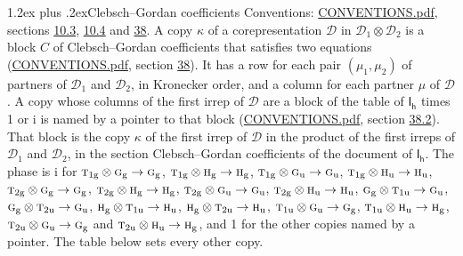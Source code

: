 \documentclass[10pt,a4paper]{article}
\makeatletter
\renewcommand\section{\@startsection{section}{1}{\z@}{-3ex plus -1ex minus -.2ex}%
  {1.2ex plus .2ex}{\normalfont\large\sffamily\bfseries\color{parttitle}}}
\numberwithin{equation}{section}
\newcommand{\grp}[1]{\mathsf{#1}}
\newcommand{\irr}[1]{\text{\normalfont\scshape #1}}
\newcommand{\ptag}[1]{\mathrm{#1}}
\newcommand{\iunit}{\mathrm{i}}
\newcommand{\irrprod}{\otimes}
\newcommand{\mult}{\kappa}
\newcommand{\intx}{\mu}
\makeatother
\begin{document}
\section{Clebsch--Gordan coefficients}\label{s:clebsch_gordan}
Conventions: \href{../../CONVENTIONS.pdf}{CONVENTIONS.pdf}, sections \href{../../../rotation/CONVENTIONS.pdf\#conv.10.3}{10.3}, \href{../../../rotation/CONVENTIONS.pdf\#conv.10.4}{10.4} and \href{../../CONVENTIONS.pdf\#conv.38}{38}.
\leavevmode\label{n:index.copy}\label{n:matrix.cg.stored}A copy $\mult$ of a corepresentation $\mathcal{D}$ in $\mathcal{D}_1\irrprod\mathcal{D}_2$ is a block $C$ of Clebsch--Gordan coefficients that satisfies two equations (\href{../../CONVENTIONS.pdf}{CONVENTIONS.pdf}, section \href{../../CONVENTIONS.pdf\#conv.38}{38}). \label{n:index.cg}It has a row for each pair $(\intx_1, \intx_2)$ of partners of $\mathcal{D}_1$ and $\mathcal{D}_2$, in Kronecker order, and a column for each partner $\intx$ of $\mathcal{D}$.
A copy whose columns of the first irrep of $\mathcal{D}$ are a block of the table of $\grp{I_{h}}$ times 1 or $\iunit$ is named by a pointer to that block (\href{../../CONVENTIONS.pdf}{CONVENTIONS.pdf}, section \href{../../CONVENTIONS.pdf\#conv.38.2}{38.2}). That block is the copy $\mult$ of the first irrep of $\mathcal{D}$ in the product of the first irreps of $\mathcal{D}_1$ and $\mathcal{D}_2$, in the section Clebsch--Gordan coefficients of the document of \href{../../../rotation/data/pdf/Ih.pdf}{$\grp{I_{h}}$}. The phase is $\iunit$ for $\irr{t}_{1\ptag{g}}\irrprod \irr{g}_{\ptag{g}}\to \irr{g}_{\ptag{g}}$, $\irr{t}_{1\ptag{g}}\irrprod \irr{h}_{\ptag{g}}\to \irr{h}_{\ptag{g}}$, $\irr{t}_{1\ptag{g}}\irrprod \irr{g}_{\ptag{u}}\to \irr{g}_{\ptag{u}}$, $\irr{t}_{1\ptag{g}}\irrprod \irr{h}_{\ptag{u}}\to \irr{h}_{\ptag{u}}$, $\irr{t}_{2\ptag{g}}\irrprod \irr{g}_{\ptag{g}}\to \irr{g}_{\ptag{g}}$, $\irr{t}_{2\ptag{g}}\irrprod \irr{h}_{\ptag{g}}\to \irr{h}_{\ptag{g}}$, $\irr{t}_{2\ptag{g}}\irrprod \irr{g}_{\ptag{u}}\to \irr{g}_{\ptag{u}}$, $\irr{t}_{2\ptag{g}}\irrprod \irr{h}_{\ptag{u}}\to \irr{h}_{\ptag{u}}$, $\irr{g}_{\ptag{g}}\irrprod \irr{t}_{1\ptag{u}}\to \irr{g}_{\ptag{u}}$, $\irr{g}_{\ptag{g}}\irrprod \irr{t}_{2\ptag{u}}\to \irr{g}_{\ptag{u}}$, $\irr{h}_{\ptag{g}}\irrprod \irr{t}_{1\ptag{u}}\to \irr{h}_{\ptag{u}}$, $\irr{h}_{\ptag{g}}\irrprod \irr{t}_{2\ptag{u}}\to \irr{h}_{\ptag{u}}$, $\irr{t}_{1\ptag{u}}\irrprod \irr{g}_{\ptag{u}}\to \irr{g}_{\ptag{g}}$, $\irr{t}_{1\ptag{u}}\irrprod \irr{h}_{\ptag{u}}\to \irr{h}_{\ptag{g}}$, $\irr{t}_{2\ptag{u}}\irrprod \irr{g}_{\ptag{u}}\to \irr{g}_{\ptag{g}}$ and $\irr{t}_{2\ptag{u}}\irrprod \irr{h}_{\ptag{u}}\to \irr{h}_{\ptag{g}}$, and 1 for the other copies named by a pointer. The table below sets every other copy.
\end{document}
